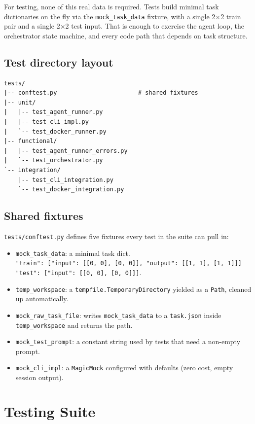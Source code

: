 \documentclass[11pt,a4paper]{article}
\begin{document}
For testing, none of this real data is required. Tests build minimal task dictionaries on the fly via the \texttt{mock\_task\_data} fixture, with a single 2$\times$2 train pair and a single 2$\times$2 test input. That is enough to exercise the agent loop, the orchestrator state machine, and every code path that depends on task structure.

\subsection{Test directory layout}

\begin{lstlisting}[caption={Tests groupings}]
tests/
|-- conftest.py                       # shared fixtures
|-- unit/
|   |-- test_agent_runner.py
|   |-- test_cli_impl.py
|   `-- test_docker_runner.py
|-- functional/
|   |-- test_agent_runner_errors.py
|   `-- test_orchestrator.py
`-- integration/
    |-- test_cli_integration.py
    `-- test_docker_integration.py
\end{lstlisting}

\subsection{Shared fixtures}

\texttt{tests/conftest.py} defines five fixtures every test in the suite can pull in:

\begin{itemize}
  \item \texttt{mock\_task\_data}: a minimal task dict.
    \\ \texttt{"train": [{"input": [[0, 0], [0, 0]], "output": [[1, 1], [1, 1]]}]}
    \\ \texttt{"test": [{"input": [[0, 0], [0, 0]]}]}.
  \item \texttt{temp\_workspace}: a \texttt{tempfile.TemporaryDirectory} yielded as a \texttt{Path}, cleaned up automatically.
  \item \texttt{mock\_raw\_task\_file}: writes \texttt{mock\_task\_data} to a \texttt{task.json} inside \texttt{temp\_workspace} and returns the path.
  \item \texttt{mock\_test\_prompt}: a constant string used by tests that need a non-empty prompt.
  \item \texttt{mock\_cli\_impl}: a \texttt{MagicMock} configured with defaults (zero cost, empty session output).
\end{itemize}

\section{Testing Suite}
\end{document}
